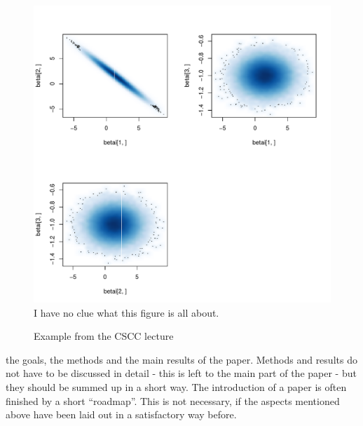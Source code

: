 \begin{figure}[!h]
\begin{center}\caption{Example from the CSCC lecture\label{fig:CSCC_plot}}
\includegraphics[width=\textwidth]{figures/CSCC_plots.pdf}\\
\tiny I have no clue what this figure is all about.
\end{center}
\end{figure}


the goals, the methods and the main results of the paper.
Methods and results do not have to be
discussed in detail - this is left to the main part of the paper -
 but they should be summed up in a short way.
 The introduction of a paper is often finished by a short ``roadmap''.
 This is not necessary, if the aspects mentioned above have been
 laid out in a satisfactory way before. \citep{hastieElementsStatisticalLearning2017}

